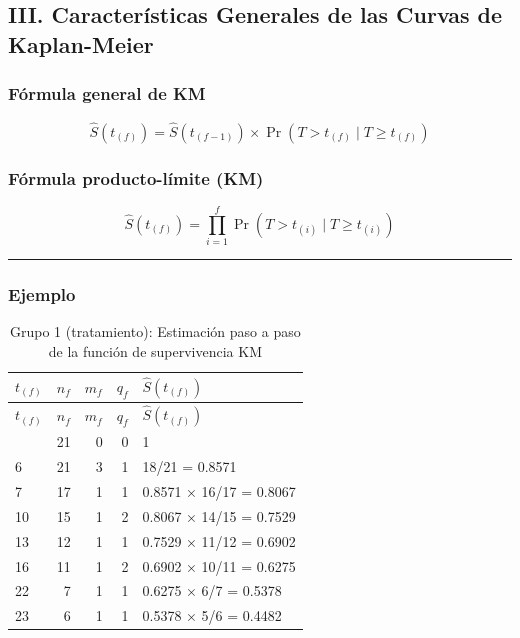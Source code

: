 \documentclass[
]{article}
\begin{document}
\subsection{III. Características Generales de las Curvas de
Kaplan-Meier}\label{iii.-caracteruxedsticas-generales-de-las-curvas-de-kaplan-meier}

\subsubsection{Fórmula general de KM}\label{fuxf3rmula-general-de-km}

\[
\hat{S}(t_{(f)}) = \hat{S}(t_{(f-1)}) \times \Pr(T > t_{(f)} \mid T \ge t_{(f)})
\]

\subsubsection{Fórmula producto-límite
(KM)}\label{fuxf3rmula-producto-luxedmite-km}

\[
\hat{S}(t_{(f)}) = \prod_{i=1}^{f} \Pr(T > t_{(i)} \mid T \ge t_{(i)})
\]

\begin{center}\rule{0.5\linewidth}{0.5pt}\end{center}

\subsubsection{Ejemplo}\label{ejemplo}

\begin{longtable}[]{@{}lrrrl@{}}
\caption{Grupo 1 (tratamiento): Estimación paso a paso de la función de
supervivencia KM}\tabularnewline
\toprule\noalign{}
\(t_{(f)}\) & \(n_f\) & \(m_f\) & \(q_f\) & \(\hat{S}(t_{(f)})\) \\
\midrule\noalign{}
\endfirsthead
\toprule\noalign{}
\(t_{(f)}\) & \(n_f\) & \(m_f\) & \(q_f\) & \(\hat{S}(t_{(f)})\) \\
\midrule\noalign{}
\endhead
\bottomrule\noalign{}
\endlastfoot
0 & 21 & 0 & 0 & 1 \\
6 & 21 & 3 & 1 & 18/21 = 0.8571 \\
7 & 17 & 1 & 1 & 0.8571 × 16/17 = 0.8067 \\
10 & 15 & 1 & 2 & 0.8067 × 14/15 = 0.7529 \\
13 & 12 & 1 & 1 & 0.7529 × 11/12 = 0.6902 \\
16 & 11 & 1 & 2 & 0.6902 × 10/11 = 0.6275 \\
22 & 7 & 1 & 1 & 0.6275 × 6/7 = 0.5378 \\
23 & 6 & 1 & 1 & 0.5378 × 5/6 = 0.4482 \\
\end{longtable}
\end{document}
